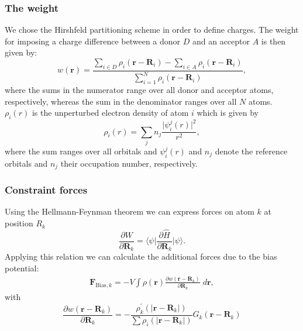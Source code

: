 \documentclass[twoside,10pt,titlepage,a4paper]{article}
\begin{document}
\subsubsection{The weight}
We chose the Hirshfeld partitioning scheme \cite{Hirshfeld77} in order to define charges. The weight for imposing a charge difference between a donor $D$ and an acceptor $A$ is then given by:
\begin{equation}
w(\mathbf{r})=\frac{\sum_{i \in D} \rho_i(\mathbf{r}-\mathbf{R}_i)-\sum_{i \in A} \rho_i(\mathbf{r}-\mathbf{R}_i)}{\sum_{i=1}^{N} \rho_i(\mathbf{r}-\mathbf{R}_i)},
\end{equation}
where the sums in the numerator range over all donor and acceptor atoms, respectively, whereas the sum in the denominator ranges over all $N$ atoms. $\rho_i(r)$ is the unperturbed electron density of atom $i$ which is given by
\begin{equation}
\rho_i(r)=\sum_j n_j \frac{\vert \psi_i^j(r)\vert^2}{r^2},
\end{equation}
where the sum ranges over all orbitals and $\psi_i^j(r)$ and $n_j$ denote the reference orbitals and $n_j$ their occupation number, respectively.

\subsubsection{Constraint forces}
Using the Hellmann-Feynman theorem we can express forces on atom $k$ at position $R_k$
\begin{equation}
\frac{\partial W}{\partial \mathbf{R}_k}=\langle \psi\vert \frac{\partial \hat{H}}{\partial \mathbf{R}_k}\vert \psi\rangle.
\end{equation}
Applying this relation we can calculate the additional forces due to the bias potential:
\begin{eqnarray}
\mathbf{F}_{\text{Bias},k}= - V \int \rho(\mathbf{r})\frac{\partial w(\mathbf{r}-\mathbf{R}_k)}{\partial \mathbf{R}_k}\;d\mathbf{r},
\end{eqnarray}
with 
\begin{equation}
\frac{\partial w(\mathbf{r}-\mathbf{R}_k)}{\partial \mathbf{R}_k}=-\frac{\rho_k^\prime(\vert\mathbf{r}-\mathbf{R}_k\vert)}{\sum \rho_i(\vert\mathbf{r}-\mathbf{R}_k\vert)} G_k(\mathbf{r}-\mathbf{R}_k)
\end{equation}
\end{document}
